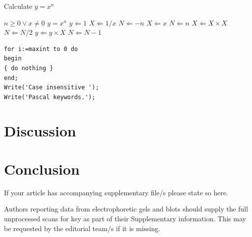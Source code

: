 \documentclass[pdflatex,sn-mathphys-num]{sn-jnl}%
\theoremstyle{thmstyleone}%
\theoremstyle{thmstyletwo}%
\theoremstyle{thmstylethree}%
\begin{document}
\begin{algorithm}
\caption{Calculate $y = x^n$}\label{algo1}
\begin{algorithmic}[1]
\Require $n \geq 0 \vee x \neq 0$
\Ensure $y = x^n$ 
\State $y \Leftarrow 1$
\label{algln2}
        \State $X \Leftarrow 1 / x$
        \State $N \Leftarrow -n$
\Else
        \State $X \Leftarrow x$
        \State $N \Leftarrow n$
\EndIf
{}
            \State $X \Leftarrow X \times X$
            \State $N \Leftarrow N / 2$
        \Else[$N$ is odd]
            \State $y \Leftarrow y \times X$
            \State $N \Leftarrow N - 1$
        \EndIf
\EndWhile
\end{algorithmic}
\end{algorithm}

\bigskip
\begin{minipage}{\hsize}%
\lstset{frame=single,framexleftmargin=-1pt,framexrightmargin=-17pt,framesep=12pt,linewidth=0.98\textwidth,language=pascal}%
\begin{lstlisting}
for i:=maxint to 0 do
begin
{ do nothing }
end;
Write('Case insensitive ');
Write('Pascal keywords.');
\end{lstlisting}
\end{minipage}


\section{Discussion}
\label{dis}


\section{Conclusion}
\label{con}


\backmatter


If your article has accompanying supplementary file/s please state so here. 

Authors reporting data from electrophoretic gels and blots should supply the full unprocessed scans for key as part of their Supplementary information. This may be requested by the editorial team/s if it is missing.
\end{document}
